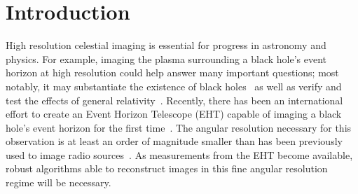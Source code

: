 \vspace{-.2in}
\section{Introduction}
\label{section:introduction}



High resolution celestial imaging is essential for progress in astronomy and physics. 
For example, imaging the plasma surrounding a black hole's event horizon at high resolution could help answer many important questions; 
most notably, it may substantiate the existence of black holes~\cite{blackholesexist} as well as verify and test the effects of general relativity~\cite{nohairtheroem}.  
Recently, there has been an international effort to create an Event Horizon Telescope (EHT) capable of imaging a black hole's event horizon for the first time~\cite{doeleman2012jet, doeleman2008event}. The angular resolution necessary for this observation is at least an order of magnitude smaller than has been previously used to image radio sources~\cite{krichbaum2006sub}.
As measurements from the EHT become available, 
robust algorithms able to reconstruct images in this fine angular resolution regime will be necessary. 

